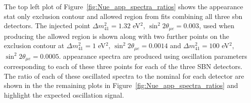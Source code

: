 \newpage
The top left plot of Figure~\ref{fig:Nue_app_spectra_ratios} shows the \nue appearance stat only exclusion contour and allowed region from fits combining all three \gls{sbn} detectors. The injected point $\Delta m^2_{41} = 1.32$ eV$^2$, $\sin^2{2\theta_{\mu e}} = 0.003$, used when producing the allowed region is shown along with two further points on the exclusion contour at $\Delta m^2_{41} = 1$ eV$^2$, $\sin^2{2\theta_{\mu e}} = 0.0014$ and $\Delta m^2_{41} = 100$ eV$^2$, $\sin^2{2\theta_{\mu e}} = 0.0005$. \nue appearance spectra are produced using oscillation parameters corresponding to each of these three points for each of the three SBN detectors. The ratio of each of these oscillated spectra to the nominal for each detector are shown in the the remaining plots in Figure~\ref{fig:Nue_app_spectra_ratios} and highlight the expected oscillation signal.


